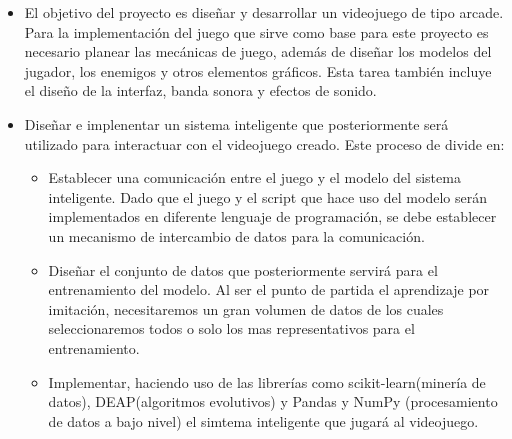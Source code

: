 
 
\begin{itemize}
    \item El objetivo del proyecto es diseñar y desarrollar un videojuego de tipo arcade. Para la implementación del juego que sirve como base para este proyecto es necesario planear las mecánicas de juego, además de diseñar los modelos del jugador, los enemigos y otros elementos gráficos. Esta tarea también incluye el diseño de la interfaz, banda sonora y efectos de sonido. 
    
    \item Diseñar e implenentar un sistema inteligente que posteriormente será utilizado para interactuar con el videojuego creado. Este proceso de divide en:
    \begin{itemize}
        \item Establecer una comunicación entre el juego y el modelo del sistema inteligente. Dado que el juego y el script que hace uso del modelo serán implementados en diferente lenguaje de programación, se debe establecer un mecanismo de intercambio de datos para la comunicación.
        \item Diseñar el conjunto de datos que posteriormente servirá para el entrenamiento del modelo. Al ser el punto de partida el aprendizaje por imitación, necesitaremos un gran volumen de datos de los cuales seleccionaremos todos o solo los mas representativos para el entrenamiento.
        \item Implementar, haciendo uso de las librerías como scikit-learn(minería de datos), DEAP(algoritmos evolutivos) y Pandas y NumPy (procesamiento de datos a bajo nivel) el simtema inteligente que jugará al videojuego.
    \end{itemize}
\end{itemize}
